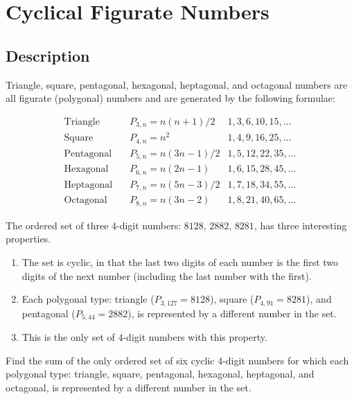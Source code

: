\section{Cyclical Figurate Numbers}
\subsection{Description}
Triangle, square, pentagonal, hexagonal, heptagonal, and octagonal numbers are all figurate (polygonal) numbers and are
generated by the following formulae:

\begin{align*}
	\text{Triangle}\quad   & P_{3,n} = n(n + 1)/2  & 1,3,6,10,15,\dots  \\
	\text{Square}\quad     & P_{4,n} = n^2         & 1,4,9,16,25,\dots  \\
	\text{Pentagonal}\quad & P_{5,n} = n(3n - 1)/2 & 1,5,12,22,35,\dots \\
	\text{Hexagonal}\quad  & P_{6,n} = n(2n - 1)   & 1,6,15,28,45,\dots \\
	\text{Heptagonal}\quad & P_{7,n} = n(5n -3)/2  & 1,7,18,34,55,\dots \\
	\text{Octagonal}\quad  & P_{8,n} = n(3n -2)    & 1,8,21,40,65,\dots
\end{align*}

The ordered set of three $4$-digit numbers: $8128$, $2882$, $8281$, has three interesting properties.

\begin{enumerate}
	\item The set is cyclic, in that the last two digits of each number is the first two digits of the next number
	      (including the last number with the first).
	\item Each polygonal type: triangle ($P_{3,127} = 8128$), square ($P_{4,91} = 8281$), and pentagonal ($P_{5,44} =
		      2882$), is represented by a different number in the set.
	\item	This is the only set of $4$-digit numbers with this property.
\end{enumerate}
Find the sum of the only ordered set of six cyclic $4$-digit numbers for which each polygonal type: triangle, square,
pentagonal, hexagonal, heptagonal, and octagonal, is represented by a different number in the set.
